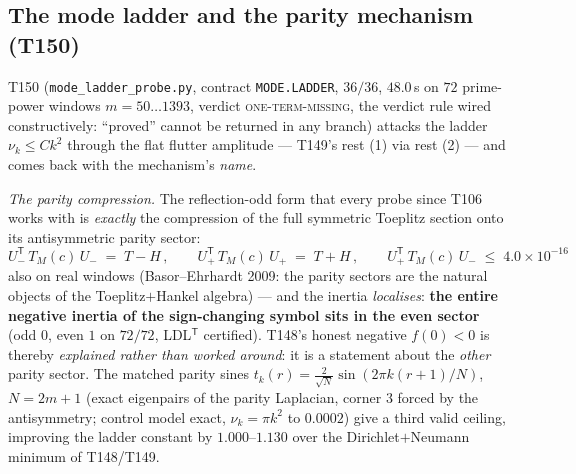 \documentclass[11pt,a4paper]{article}
\begin{document}
\subsection{The mode ladder and the parity mechanism (T150)}
T150 (\texttt{mode\_ladder\_probe.py}, contract \texttt{MODE.LADDER}, $36/36$, $48.0$\,s on
$72$ prime-power windows $m=50\ldots1393$, verdict \textsc{one-term-missing}, the verdict rule
wired constructively: ``proved'' cannot be returned in any branch) attacks the ladder
$\nu_k\le Ck^2$ through the flat flutter amplitude --- T149's rest (1) via rest (2) --- and
comes back with the mechanism's \emph{name}.

\emph{The parity compression.} The reflection-odd form that every probe since T106 works with
is \emph{exactly} the compression of the full symmetric Toeplitz section onto its
antisymmetric parity sector:
\[
U_-^{\mathsf T}\,T_M(c)\,U_-\;=\;T-H\,,\qquad
U_+^{\mathsf T}\,T_M(c)\,U_+\;=\;T+H\,,\qquad
U_+^{\mathsf T}\,T_M(c)\,U_-\;\le\;4.0\times10^{-16}
\]
also on real windows (Basor--Ehrhardt 2009: the parity sectors are the natural objects of the
Toeplitz$+$Hankel algebra) --- and the inertia \emph{localises}: \textbf{the entire negative
inertia of the sign-changing symbol sits in the even sector} (odd $0$, even $1$ on $72/72$,
LDL$^{\mathsf T}$ certified). T148's honest negative $f(0)<0$ is thereby \emph{explained
rather than worked around}: it is a statement about the \emph{other} parity sector. The
matched parity sines $t_k(r)=\tfrac{2}{\sqrt N}\sin(2\pi k(r{+}1)/N)$, $N=2m{+}1$ (exact
eigenpairs of the parity Laplacian, corner $3$ forced by the antisymmetry; control model exact,
$\nu_k=\pi k^2$ to $0.0002$) give a third valid ceiling, improving the ladder constant by
$1.000$--$1.130$ over the Dirichlet$+$Neumann minimum of T148/T149.
\end{document}
